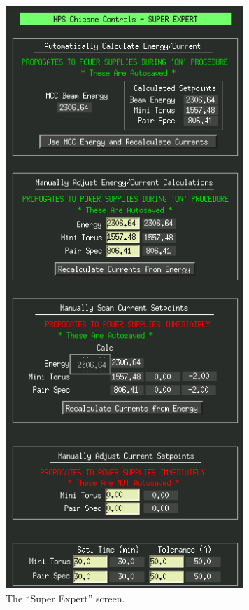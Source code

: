 \documentclass[amsmath,amssymb,notitlepage,11pt]{revtex4-1}
\begin{document}
\begin{figure}[htbp]\centering
    \includegraphics[height=22cm]{pics/expert}
    \caption{The ``Super Expert'' screen.\label{fig:superexpert}}
\end{figure}



\end{document}
